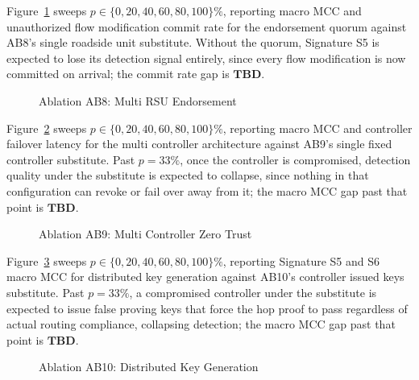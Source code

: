 \documentclass[final,5p,twocolumn]{elsarticle}
\theoremstyle{remark}
\theoremstyle{plain}
\newcommand{\TBD}{\textbf{TBD}} %
\begin{document}
Figure~\ref{fig:ab8} sweeps $p \in \{0,20,40,60,80,100\}\%$, reporting
macro MCC and unauthorized flow modification commit rate for the
endorsement quorum against AB8's single roadside unit substitute. Without
the quorum, Signature S5 is expected to lose its detection signal
entirely, since every flow modification is now committed on arrival; the
commit rate gap is $\TBD$.
\begin{figure}[!t]
	\centering
	\caption{Ablation AB8: Multi RSU Endorsement}
	\label{fig:ab8}
\end{figure}

Figure~\ref{fig:ab9} sweeps $p \in \{0,20,40,60,80,100\}\%$, reporting
macro MCC and controller failover latency for the multi controller
architecture against AB9's single fixed controller substitute. Past
$p{=}33\%$, once the controller is compromised, detection quality under
the substitute is expected to collapse, since nothing in that
configuration can revoke or fail over away from it; the macro MCC gap
past that point is $\TBD$.
\begin{figure}[!t]
	\centering
	\caption{Ablation AB9: Multi Controller Zero Trust}
	\label{fig:ab9}
\end{figure}

Figure~\ref{fig:ab10} sweeps $p \in \{0,20,40,60,80,100\}\%$,
reporting Signature S5 and S6 macro MCC for distributed key generation
against AB10's controller issued keys substitute. Past $p{=}33\%$, a
compromised controller under the substitute is expected to issue false
proving keys that force the hop proof to pass regardless of actual
routing compliance, collapsing detection; the macro MCC gap past that
point is $\TBD$.
\begin{figure}[!t]
	\centering
	\caption{Ablation AB10: Distributed Key Generation}
	\label{fig:ab10}
\end{figure}
\end{document}
